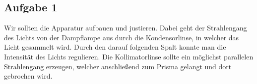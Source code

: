 \subsection{Aufgabe 1}

Wir sollten die Apparatur aufbauen und justieren. Dabei geht der Strahlengang  des Lichts von der Dampflampe aus durch die Kondensorlinse, in welcher das Licht gesammelt wird. Durch den darauf folgenden Spalt konnte man die Intensität des Lichts regulieren. Die Kollimatorlinse sollte ein möglichst parallelen Strahlengang erzeugen, welcher anschließend zum Prisma gelangt und dort gebrochen wird.
\\
\begin{center}
\begin{minipage}{\linewidth}
\centering
{}
%
\label{ringe}
\end{minipage}
\end{center}